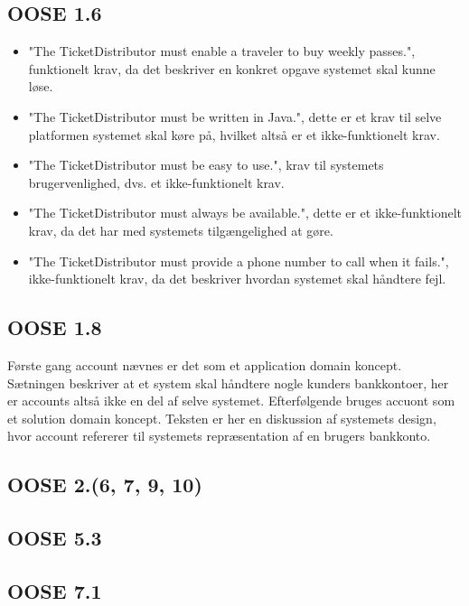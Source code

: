 \documentclass[12pt]{article}
\begin{document}
\subsection{OOSE 1.6}
\begin{itemize}
\item "The TicketDistributor must enable a traveler to buy weekly passes.",	funktionelt krav, da det beskriver en konkret opgave systemet skal kunne løse.
\item "The TicketDistributor must be written in Java.", dette er et krav til selve platformen systemet skal køre på, hvilket altså er et ikke-funktionelt krav.
\item "The TicketDistributor must be easy to use.", krav til systemets brugervenlighed, dvs. et ikke-funktionelt krav.
\item "The TicketDistributor must always be available.", dette er et ikke-funktionelt krav, da det har med systemets tilgængelighed at gøre.
\item "The TicketDistributor must provide a phone number to call when it fails.", ikke-funktionelt krav, da det beskriver hvordan systemet skal håndtere fejl.
\end{itemize}
\subsection{OOSE 1.8}
Første gang account nævnes er det som et application domain koncept. Sætningen beskriver at et system skal håndtere nogle kunders bankkontoer, her er accounts altså ikke en del af selve systemet. Efterfølgende bruges accuont som et solution domain koncept. Teksten er her en diskussion af systemets design, hvor account refererer til systemets repræsentation af en brugers bankkonto.
\subsection{OOSE 2.(6, 7, 9, 10)}
\subsection{OOSE 5.3}
\subsection{OOSE 7.1}
\end{document}

